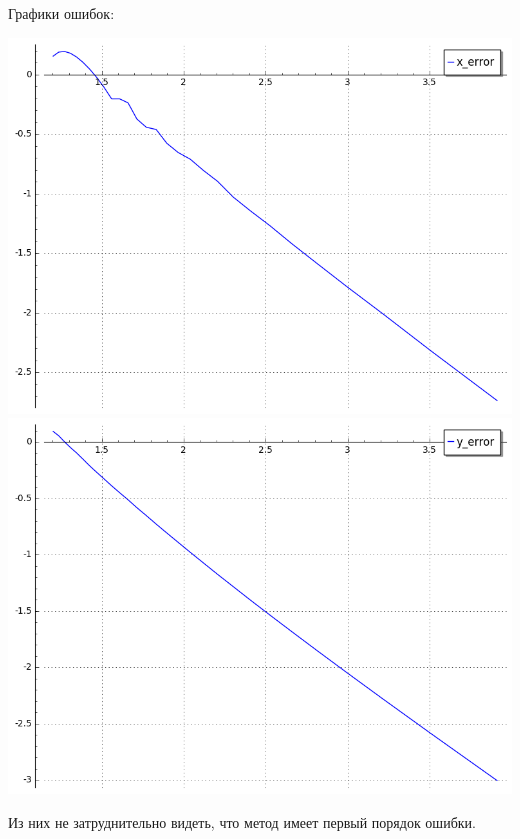 \documentclass{article}
\theoremstyle{definition}
\theoremstyle{remark}
\begin{document}
Графики ошибок:

\includegraphics[width=0.4 \textwidth]{diff_eq_x_error.png}
\includegraphics[width=0.4 \textwidth]{diff_eq_y_error.png}

Из них не затруднительно видеть, что метод имеет первый порядок ошибки.
\end{document}
